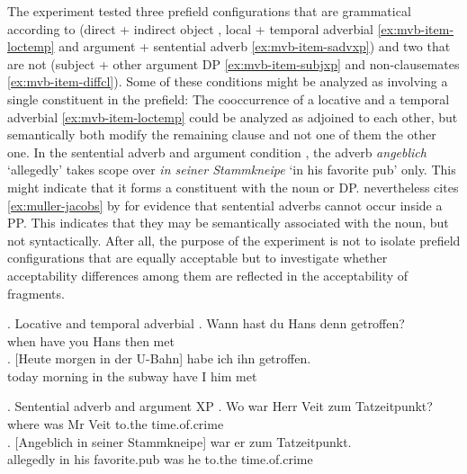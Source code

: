 The experiment tested three prefield configurations that are grammatical according to \citet{muller2005} (direct + indirect object \Last, local + temporal adverbial \ref{ex:mvb-item-loctemp} and argument + sentential adverb \ref{ex:mvb-item-sadvxp}) and two that are not (subject + other argument DP \ref{ex:mvb-item-subjxp} and non-clausemates \ref{ex:mvb-item-diffcl}). Some of these conditions might be analyzed as involving a single constituent in the prefield: The cooccurrence of a locative and a temporal adverbial \ref{ex:mvb-item-loctemp} could be analyzed as adjoined to each other, but semantically both modify the remaining clause and not one of them the other one. In the sentential adverb and argument condition \NNext, the adverb \textit{angeblich} `allegedly' takes scope over \textit{in seiner Stammkneipe} `in his favorite pub' only. This might indicate that it forms a constituent with the noun or DP. \citet[31]{muller2003} nevertheless cites \ref{ex:muller-jacobs} by \citet[112]{jacobs1986} for evidence that sentential adverbs cannot occur inside a PP. This indicates that they may be semantically associated with the noun, but not syntactically. After all, the purpose of the experiment is not to isolate prefield configurations that are equally acceptable but to investigate whether acceptability differences among them are reflected in the acceptability of fragments.

\newpage
\ex. Locative and temporal adverbial\label{ex:mvb-item-loctemp}
\ag. Wann hast  du   Hans denn getroffen? \\
when have you Hans  then  met\\
\bg. [Heute morgen  in der U-Bahn] habe ich ihn getroffen.\\
today   morning in the subway  have I    him met\\

\ex. Sentential adverb and argument XP\label{ex:mvb-item-sadvxp}
\ag. Wo  war Herr Veit zum   Tatzeitpunkt?\\
    where  was Mr    Veit to.the time.of.crime\\
\bg. [Angeblich in seiner  Stammkneipe] war er  zum  Tatzeitpunkt.\\
allegedly in his favorite.pub was he to.the time.of.crime\\

